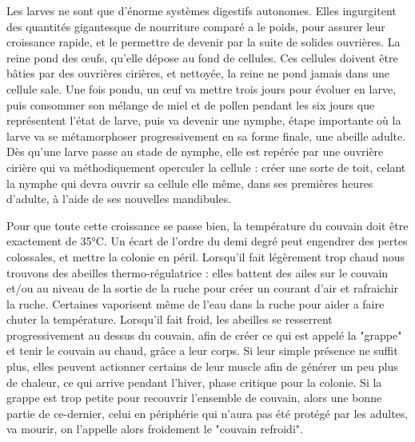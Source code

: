 			Les larves ne sont que d'énorme systèmes digestifs autonomes. Elles ingurgitent des quantités gigantesque de nourriture comparé a le poids, pour assurer leur croissance rapide, et le permettre de devenir par la suite de solides ouvrières. La reine pond des œufs, qu'elle dépose au fond de cellules. Ces cellules doivent être bâties par des ouvrières cirières, et nettoyée, la reine ne pond jamais dans une cellule sale. Une fois pondu, un œuf va mettre trois jours pour évoluer en larve, puis consommer son mélange de miel et de pollen pendant les six jours que représentent l'état de larve, puis va devenir une nymphe, étape importante où la larve va se métamorphoser progressivement en sa forme finale, une abeille adulte. Dès qu'une larve passe au stade de nymphe, elle est repérée par une ouvrière cirière qui va méthodiquement operculer la cellule : créer une sorte de toit, celant la nymphe qui devra ouvrir sa cellule elle même, dans ses premières heures d'adulte, à l'aide de ses nouvelles mandibules.
			
			Pour que toute cette croissance se passe bien, la température du couvain doit être exactement de 35°C. Un écart de l'ordre du demi degré peut engendrer des pertes colossales, et mettre la colonie en péril. Lorsqu'il fait légèrement trop chaud nous trouvons des abeilles thermo-régulatrice : elles battent des ailes sur le couvain et/ou au niveau de la sortie de la ruche pour créer un courant d'air et rafraichir la ruche. Certaines vaporisent même de l'eau dans la ruche pour aider a faire chuter la température. Lorsqu'il fait froid, les abeilles se resserrent progressivement au dessus du couvain, afin de créer ce qui est appelé la "grappe" et tenir le couvain au chaud, grâce a leur corps. Si leur simple présence ne suffit plus, elles peuvent actionner certains de leur muscle afin de générer un peu plus de chaleur, ce qui arrive pendant l'hiver, phase critique pour la colonie. Si la grappe est trop petite pour recouvrir l'ensemble de couvain, alors une bonne partie de ce-dernier, celui en périphérie qui n'aura pas été protégé par les adultes, va mourir, on l'appelle alors froidement le "couvain refroidi".
			
